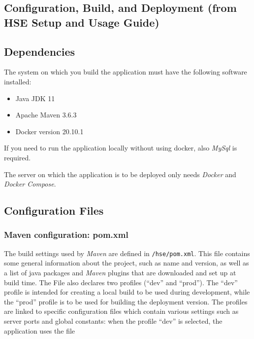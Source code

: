 \documentclass[a4paper]{usiinfbachelorproject}
\begin{document}
\begin{appendices}

        \section{Configuration, Build, and Deployment (from HSE Setup and Usage Guide)}
        \label{sec:deployment}

        \subsection{Dependencies}

        The system on which you build the application must have the following software installed:

        \begin{itemize}

        \item Java JDK 11

        \item Apache Maven 3.6.3

        \item Docker version 20.10.1

        \end{itemize}

        If you need to run the application locally without using docker, also \emph{MySql} is required. 

        The server on which the application is to be deployed only needs \emph{Docker} and \emph{Docker Compose}.

        \subsection{Configuration Files}

        \subsubsection{Maven configuration: pom.xml}

        The build settings used by \emph{Maven} are defined in \texttt{/hse/pom.xml}. This file contains some general information
        about the project, such as name and version, as well as a list of java packages and \emph{Maven} plugins that are 
        downloaded and set up at build time. The File also declares two profiles (``dev'' and ``prod''). The ``dev'' profile 
        is intended for creating a local build to be used during development, while the ``prod'' profile is to be used for building the deployment version.
        The profiles are linked to specific configuration files which contain various settings such as server ports and global
        constants: when the profile ``dev'' is selected, the application uses the file 


\end{appendices}
\end{document}
